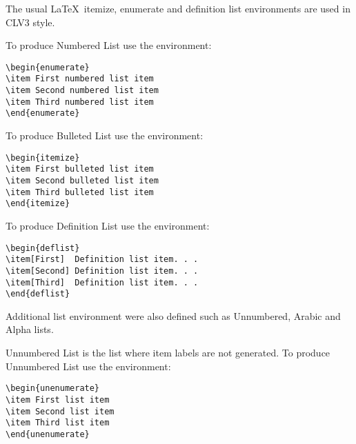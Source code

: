 \documentclass[manuscript]{clv3}
\begin{document}
The usual \LaTeX\ itemize, enumerate and definition list environments are used 
in CLV3 style. 

To produce Numbered List use the environment:

\begin{verbatim}
\begin{enumerate}
\item First numbered list item
\item Second numbered list item
\item Third numbered list item
\end{enumerate}
\end{verbatim}

To produce Bulleted List use the environment:

\begin{verbatim}
\begin{itemize}
\item First bulleted list item
\item Second bulleted list item
\item Third bulleted list item
\end{itemize}
\end{verbatim}

To produce Definition List use the environment:

\begin{verbatim}
\begin{deflist}
\item[First]  Definition list item. . .
\item[Second] Definition list item. . .
\item[Third]  Definition list item. . .
\end{deflist}
\end{verbatim}

Additional list environment were also defined such as Unnumbered, Arabic and Alpha lists.

Unnumbered List is the list where item labels are not generated. To produce Unnumbered List use the environment:

\begin{verbatim}
\begin{unenumerate}
\item First list item
\item Second list item
\item Third list item
\end{unenumerate}
\end{verbatim}
\end{document}
